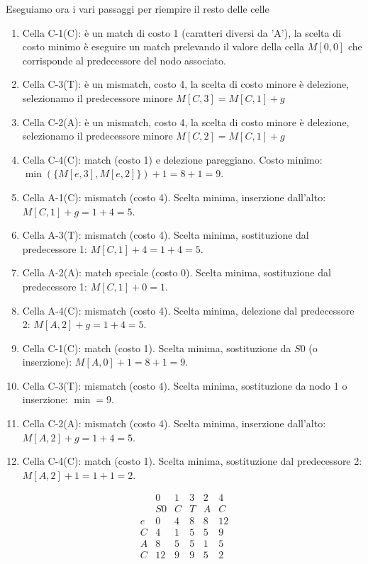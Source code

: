 \documentclass[11pt, a4paper]{article}
\begin{document}
Eseguiamo ora i vari passaggi per riempire il resto delle celle
\begin{enumerate}
    \item Cella C-1(C): è un match di costo 1 (caratteri diversi da 'A'),
            la scelta di costo minimo è eseguire un match prelevando
            il valore della cella $M[0,0]$ che corrisponde al
            predecessore del nodo associato.
    \item Cella C-3(T): è un mismatch, costo 4, la scelta di costo
          minore è delezione, selezionamo il predecessore
          minore $M[C,3] = M[C,1] + g $
    \item Cella C-2(A): è un mismatch, costo 4, la scelta di costo
          minore è delezione, selezionamo il predecessore
          minore $M[C,2] = M[C,1] + g $
    \item Cella C-4(C): match (costo 1) e delezione pareggiano. Costo minimo: $\min(\{M[e,3], M[e,2]\}) + 1 = 8 + 1 = 9$.
    \item Cella A-1(C): mismatch (costo 4). Scelta minima, inserzione dall'alto: $M[C,1] + g = 1 + 4 = 5$.
    \item Cella A-3(T): mismatch (costo 4). Scelta minima, sostituzione dal predecessore 1: $M[C,1] + 4 = 1 + 4 = 5$.
    \item Cella A-2(A): match speciale (costo 0). Scelta minima, sostituzione dal predecessore 1: $M[C,1] + 0 = 1$.
    \item Cella A-4(C): mismatch (costo 4). Scelta minima, delezione dal predecessore 2: $M[A,2] + g = 1 + 4 = 5$.
    \item Cella C-1(C): match (costo 1). Scelta minima, sostituzione da $S0$ (o inserzione): $M[A,0] + 1 = 8 + 1 = 9$.
    \item Cella C-3(T): mismatch (costo 4). Scelta minima, sostituzione da nodo 1 o inserzione: $\min = 9$.
    \item Cella C-2(A): mismatch (costo 4). Scelta minima, inserzione dall'alto: $M[A,2] + g = 1 + 4 = 5$.
    \item Cella C-4(C): match (costo 1). Scelta minima, sostituzione dal predecessore 2: $M[A,2] + 1 = 1 + 1 = 2$.
\end{enumerate}


\begin{table}[H]
    \centering
    \[
    \begin{array}{c|ccccc}
        & 0 & 1 & 3 & 2 & 4 \\
        & S0 & C & T & A & C \\
    \hline
    e & 0  & 4 & 8 & 8 & 12 \\
    C & 4  & 1 & 5 & 5 & 9  \\
    A & 8  & 5 & 5 & 1 & 5  \\
    C & 12 & 9 & 9 & 5 & 2  \\
    \end{array}
    \]
    \caption{Matrice delle distanze di edit per il Toy Example}
    \label{tab:matrice-edit-toy-example}
\end{table}
\end{document}
